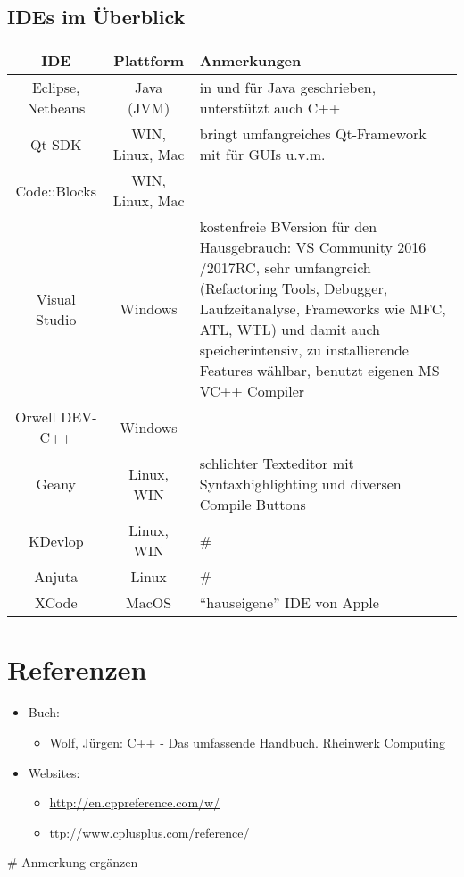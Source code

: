 \documentclass[a4paper]{report}
\theoremstyle{nonumberplain}
\begin{document}
\subsection{IDEs im Überblick}
\begin{center}
\begin{tabular}{|c|c|p{10cm}|}
	\hline
	\textbf{IDE} & \textbf{Plattform} & \textbf{Anmerkungen}\\
	\hline
	Eclipse, Netbeans & Java (JVM) & in und für Java geschrieben, unterstützt auch C++ \\
	Qt SDK & WIN, Linux, Mac & bringt umfangreiches Qt-Framework mit für GUIs u.v.m. \\
	Code::Blocks & WIN, Linux, Mac & \\
	\hline
	Visual Studio & Windows & kostenfreie BVersion für den Hausgebrauch: VS Community 2016 /2017RC, sehr umfangreich (Refactoring Tools, Debugger, Laufzeitanalyse, Frameworks wie MFC, ATL, WTL) und damit auch speicherintensiv, zu installierende Features wählbar, benutzt eigenen MS VC++ Compiler\\
	Orwell DEV-C++ & Windows &\\
	\hline
	Geany & Linux, WIN & schlichter Texteditor mit Syntaxhighlighting und diversen Compile Buttons\\
	KDevlop & Linux, WIN & \# \\
	Anjuta & Linux & \# \\
	\hline
	XCode & MacOS & "`hauseigene"' IDE von Apple\\
	\hline
	
\end{tabular}
\end{center}

\section{Referenzen}

\begin{itemize}
	\item Buch:
	\begin{itemize}
		\item Wolf, Jürgen: C++ - Das umfassende Handbuch. Rheinwerk Computing
	\end{itemize}
	\item Websites:
	\begin{itemize}
		\item \url{http://en.cppreference.com/w/}
		\item \url{ttp://www.cplusplus.com/reference/}
	\end{itemize}
\end{itemize}
\# Anmerkung ergänzen
\end{document}

